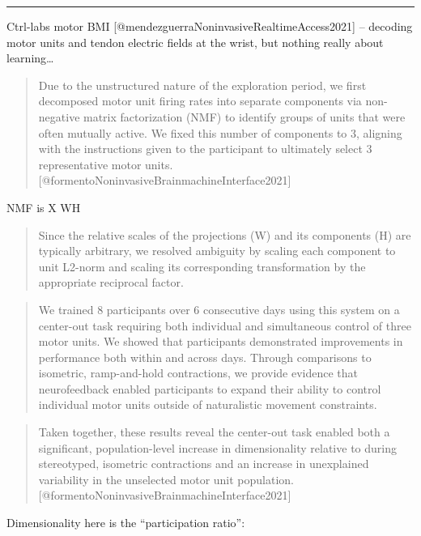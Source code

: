 \documentclass[../main.tex]{subfiles}
\begin{document}
\begin{center}\rule{0.5\linewidth}{0.5pt}\end{center}

Ctrl-labs motor BMI {[}@mendezguerraNoninvasiveRealtimeAccess2021{]} -- decoding motor units and tendon electric fields at the wrist, but nothing really about learning\ldots{}

\begin{quote}
Due to the unstructured nature of the exploration period, we first decomposed motor unit firing rates into separate components via non-negative matrix factorization (NMF) to identify groups of units that were often mutually active. We fixed this number of components to 3, aligning with the instructions given to the participant to ultimately select 3 representative motor units. {[}@formentoNoninvasiveBrainmachineInterface2021{]}
\end{quote}

NMF is X \approx WH

\begin{quote}
Since the relative scales of the projections (W) and its components (H) are typically arbitrary, we resolved ambiguity by scaling each component to unit L2-norm and scaling its corresponding transformation by the appropriate reciprocal factor.
\end{quote}

\begin{quote}
We trained 8 participants over 6 consecutive days using this system on a center-out task requiring both individual and simultaneous control of three motor units. We showed that participants demonstrated improvements in performance both within and across days. Through comparisons to isometric, ramp-and-hold contractions, we provide evidence that neurofeedback enabled participants to expand their ability to control individual motor units outside of naturalistic movement constraints.
\end{quote}

\begin{quote}
Taken together, these results reveal the center-out task enabled both a significant, population-level increase in dimensionality relative to during stereotyped, isometric contractions and an increase in unexplained variability in the unselected motor unit population. {[}@formentoNoninvasiveBrainmachineInterface2021{]}
\end{quote}

Dimensionality here is the ``participation ratio'':
\end{document}
